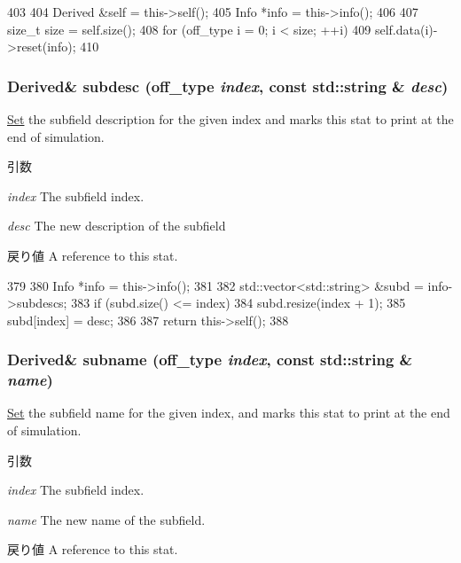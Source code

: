 \begin{DoxyCode}
403     {
404         Derived &self = this->self();
405         Info *info = this->info();
406 
407         size_t size = self.size();
408         for (off_type i = 0; i < size; ++i)
409             self.data(i)->reset(info);
410     }
\end{DoxyCode}
\hypertarget{classStats_1_1DataWrapVec_a07022e322c6f68196007ff5a4af1c191}{
\subsubsection[{subdesc}]{\setlength{\rightskip}{0pt plus 5cm}Derived\& subdesc ({\bf off\_\-type} {\em index}, \/  const std::string \& {\em desc})}}
\label{classStats_1_1DataWrapVec_a07022e322c6f68196007ff5a4af1c191}
\hyperlink{classSet}{Set} the subfield description for the given index and marks this stat to print at the end of simulation. 
\begin{DoxyParams}{引数}
\item[{\em index}]The subfield index. \item[{\em desc}]The new description of the subfield \end{DoxyParams}
\begin{DoxyReturn}{戻り値}
A reference to this stat. 
\end{DoxyReturn}



\begin{DoxyCode}
379     {
380         Info *info = this->info();
381 
382         std::vector<std::string> &subd = info->subdescs;
383         if (subd.size() <= index)
384             subd.resize(index + 1);
385         subd[index] = desc;
386 
387         return this->self();
388     }
\end{DoxyCode}
\hypertarget{classStats_1_1DataWrapVec_a74726d23d92792c7c3cebdaf3bfd23f0}{
\subsubsection[{subname}]{\setlength{\rightskip}{0pt plus 5cm}Derived\& subname ({\bf off\_\-type} {\em index}, \/  const std::string \& {\em name})}}
\label{classStats_1_1DataWrapVec_a74726d23d92792c7c3cebdaf3bfd23f0}
\hyperlink{classSet}{Set} the subfield name for the given index, and marks this stat to print at the end of simulation. 
\begin{DoxyParams}{引数}
\item[{\em index}]The subfield index. \item[{\em name}]The new name of the subfield. \end{DoxyParams}
\begin{DoxyReturn}{戻り値}
A reference to this stat. 
\end{DoxyReturn}



